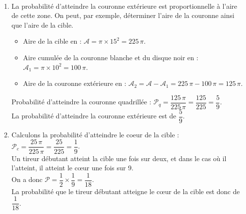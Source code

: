 \begin{corrige}
\ \\ [-5mm]
   \begin{enumerate}
      \item La probabilité d'atteindre la couronne extérieure est proportionnelle à l'aire de cette zone. On peut, par exemple, déterminer l'aire de la couronne ainsi que l'aire de la cible.
         \begin{itemize}
            \item Aire de la cible en \ucmq{} : $\mathcal{A} =\pi\times15^2 =225\,\pi$.
            \item Aire cumulée de la couronne blanche et du disque noir en \ucmq{} : $\mathcal{A}_1 =\pi\times10^2 =100\,\pi$.
            \item Aire de la couronne extérieure en \ucmq{} : $\mathcal{A}_2 =\mathcal{A} -\mathcal{A}_1 =225\,\pi-100\,\pi =125\,\pi$. \smallskip
         \end{itemize}
         Probabilité d'atteindre la couronne quadrillée : $\mathcal{P}_q =\dfrac{125\,\pi}{225\,\pi} =\dfrac{125}{225} =\dfrac59$. \\ [1mm]
         {\blue La probabilité d'atteindre la couronne extérieure est de $\dfrac59$.}
      \item Calculons la probabilité d'atteindre le coeur de la cible : $\mathcal{P}_c =\dfrac{25\,\pi}{225\,\pi} =\dfrac{25}{225} =\dfrac19$. \\ [1.5mm]
         Un tireur débutant atteint la cible une fois sur deux, et dans le cas où il l'atteint, il atteint le c\oe ur une fois sur 9. \\ [1mm]
         On a donc $\mathcal{P} =\dfrac12\times\dfrac19 =\dfrac{1}{18}$. \\
         {\blue La probabilité que le tireur débutant atteigne le c\oe ur de la cible est donc de $\dfrac{1}{18}$.}
   \end{enumerate}
\end{corrige}

\bigskip


